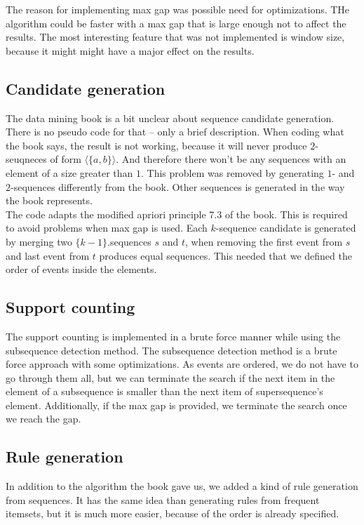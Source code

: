 The reason for implementing max gap was possible need for optimizations. THe algorithm could be faster 
with a max gap that is large enough not to affect the results. The most interesting feature 
that was not implemented is window size, because it might might have a major effect on 
the results.

\subsection{Candidate generation}
The data mining book is a bit unclear about sequence candidate generation. There is no pseudo code for that -- only a brief description. When coding what the book says, the result is not working, because it will never produce $2$-seuqneces of form $\langle\{a,b\}\rangle$. And therefore there won't be any sequences with an element of a size greater than $1$. This problem was removed by generating $1$- and $2$-sequences differently from the book. Other sequences is generated in the way the book represents.\\ 

The code adapts the modified apriori principle 7.3 of the book. This is required to avoid problems when max gap is used. Each $k$-sequence candidate is generated by merging two $\{k-1\}$.sequences $s$ and $t$, when removing the first event from $s$ and last event from $t$ produces equal sequences. This needed that we defined the order of events inside the elements.

\subsection{Support counting}
The support counting is implemented in a brute force manner while using the subsequence detection method. The subsequence detection method is a brute force approach with some optimizations. As events are ordered, we do not have to go through them all, but we can terminate the search if the next item in the element of a subsequence is smaller than the next item of supersequence’s element. Additionally, if the max gap is provided, we terminate the search once we reach the gap.

\subsection{Rule generation}
In addition to the algorithm the book gave us, we added a kind of rule generation from sequences. It has the same idea than generating rules from frequent itemsets, but it is much more easier, because of the order is already specified.
